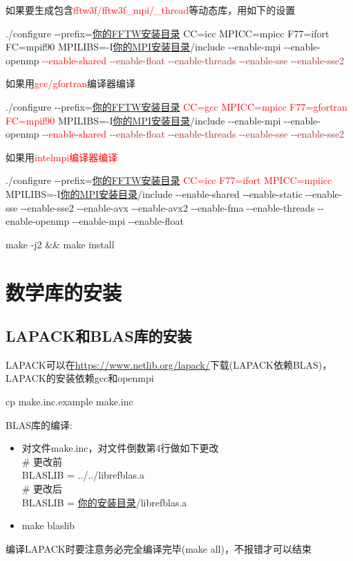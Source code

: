 \documentclass[10pt,a4paper]{article}
\begin{document}
如果要生成包含\textrm{\textcolor{red}{fftw3f/fftw3f\_mpi/\_thread}}等动态库，用如下的设置

./configure -\/-prefix=\underline{你的FFTW安装目录} CC=icc MPICC=mpicc F77=ifort FC=mpif90 MPILIBS=-I\underline{你的MPI安装目录}/include -\/-enable-mpi  -\/-enable-openmp \textcolor{red}{-\/-enable-shared }\textcolor{brown}{-\/-enable-float -\/-enable-threads -\/-enable-sse -\/-enable-sse2}

如果用\textcolor{red}{\textrm{gcc/gfortran}}编译器编译

./configure -\/-prefix=\underline{你的FFTW安装目录} \textcolor{red}{CC=gcc MPICC=mpicc F77=gfortran FC=mpif90} MPILIBS=-I\underline{你的MPI安装目录}/include -\/-enable-mpi  -\/-enable-openmp \textcolor{red}{-\/-enable-shared} \textcolor{brown}{-\/-enable-float -\/-enable-threads -\/-enable-sse -\/-enable-sse2}

如果用\textcolor{red}{\textrm{intelmpi}编译器编译}

./configure -\/-prefix=\underline{你的FFTW安装目录} \textcolor{red}{CC=icc F77=ifort MPICC=mpiicc} MPILIBS=-I\underline{你的MPI安装目录}/include -\/-enable-shared -\/-enable-static -\/-enable-sse -\/-enable-sse2 -\/-enable-avx -\/-enable-avx2 -\/-enable-fma -\/-enable-threads -\/-enable-openmp -\/-enable-mpi -\/-enable-float

make -j2 \&\& make install

\section{数学库的安装}
\subsection{{\rm LAPACK}和{\rm BLAS}库的安装}
\textrm{LAPACK}可以在\url{https://www.netlib.org/lapack/}下载(\textrm{LAPACK}依赖\textrm{BLAS})，\textrm{LAPACK}的安装依赖\textrm{gcc}和\textrm{openmpi}

\textrm{cp make.inc.example make.inc}

\textrm{BLAS}库的编译:
\begin{itemize}
	\item  对文件\textrm{make.inc}，对文件倒数第4行做如下更改\\
	\# 更改前\\
	\textrm{BLASLIB      = ../../librefblas.a} \\
\# 更改后\\
\textrm{BLASLIB      = \underline{你的安装目录}/librefblas.a}
\item \textrm{make blaslib}
\end{itemize}
编译\textrm{LAPACK}时要注意务必完全编译完毕(\textrm{make all})，不报错才可以结束
\end{document}

